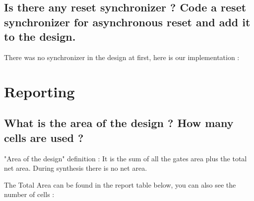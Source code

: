 \documentclass[11pt,a4paper,sans,dvipsnames]{report}
\begin{document}
	\newpage
	\subsection*{Is there any reset synchronizer ? Code a reset synchronizer for asynchronous reset and add it to the
		design.}

	There was no synchronizer in the design at first, here is our implementation :

	\begin{figure}[h!]
		\centering
		
		\label{fig:async_synchronizer_mips32_code}
	\end{figure}





	\newpage
	\section{Reporting}


	\subsection*{What is the area of the design ? How many cells are used ?}

	\par "Area of the design" definition : It is the sum of all the gates area plus the total net area. During synthesis there is no net area. 

	\par The Total Area can be found in the report table below, you can also see the number of cells :
\end{document}
